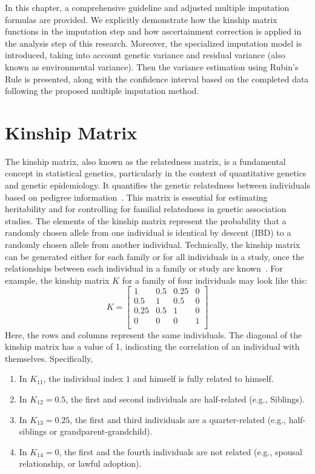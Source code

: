 In this chapter, a comprehensive guideline and adjusted multiple imputation formulas are provided. 
We explicitly demonstrate how the kinship matrix functions in the imputation step and how ascertainment correction is applied in the analysis step of this research.
Moreover, the specialized imputation model is introduced, taking into account genetic variance and residual variance (also known as environmental variance).
Then the variance estimation using Rubin's Rule is presented, along with the confidence interval based on the completed data following the proposed multiple imputation method.

\section{Kinship Matrix}
The kinship matrix, also known as the relatedness matrix, is a fundamental concept in statistical genetics, particularly in the context of quantitative genetics and genetic epidemiology. 
It quantifies the genetic relatedness between individuals based on pedigree information~\cite{lynch1998genetics}. 
This matrix is essential for estimating heritability and for controlling for familial relatedness in genetic association studies. 
The elements of the kinship matrix represent the probability that a randomly chosen allele from one individual is identical by descent (IBD) to a randomly chosen allele from another individual.
Technically, the kinship matrix can be generated either for each family or for all individuals in a study, once the relationships between each individual in a family or study are known~\cite{sinnwell2014kinship2}.
For example, the kinship matrix $K$ for a family of four individuals may look like this:
\begin{equation*}
    K = \begin{bmatrix}
    1    & 0.5  & 0.25 & 0 \\
    0.5  & 1    & 0.5  & 0 \\
    0.25 & 0.5 & 1    & 0 \\
    0    & 0    & 0    & 1 \\
    \end{bmatrix}
\end{equation*}
Here, the rows and columns represent the same individuals.
The diagonal of the kinship matrix has a value of 1, indicating the correlation of an individual with themselves.
Specifically, 
\begin{enumerate}
    \item In $K_{11}$, the individual index $1$ and himself is fully related to himself. 
    \item In $K_{12}=0.5$, the first and second individuals are half-related (e.g., Siblings). 
    \item In $K_{13}=0.25$, the first and third individuals are a quarter-related (e.g., half-siblings or grandparent-grandchild). 
    \item In $K_{14}=0$, the first and the fourth individuals are not related (e.g., spousal relationship, or lawful adoption). 
\end{enumerate}


